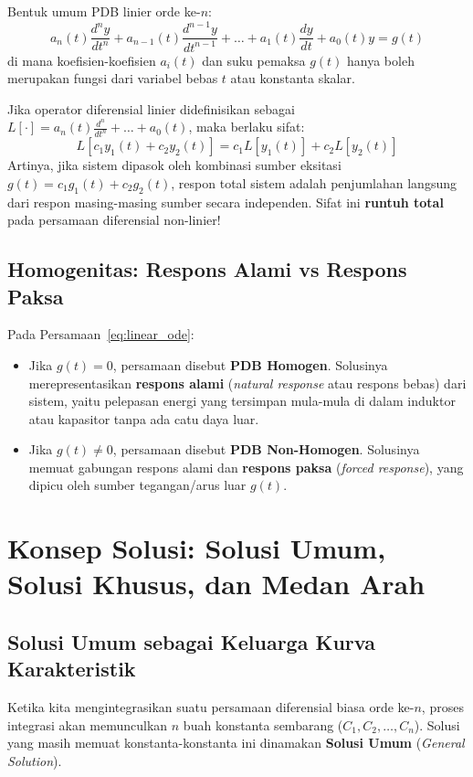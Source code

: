 \documentclass[11pt,a4paper]{article}
\theoremstyle{definition}
\begin{document}
Bentuk umum PDB linier orde ke-$n$:
\begin{equation}
    a_n(t) \frac{d^ny}{dt^n} + a_{n-1}(t) \frac{d^{n-1}y}{dt^{n-1}} + \dots + a_1(t) \frac{dy}{dt} + a_0(t) y = g(t)
    \label{eq:linear_ode}
\end{equation}
di mana koefisien-koefisien $a_i(t)$ dan suku pemaksa $g(t)$ hanya boleh merupakan fungsi dari variabel bebas $t$ atau konstanta skalar.

\begin{tcolorbox}[colback=yellow!10!white,colframe=orange!80!black,title=\textbf{Prinsip Superposisi pada PDB Linier}]
Jika operator diferensial linier didefinisikan sebagai $L[\cdot] = a_n(t)\frac{d^n}{dt^n} + \dots + a_0(t)$, maka berlaku sifat:
\begin{equation}
    L[c_1 y_1(t) + c_2 y_2(t)] = c_1 L[y_1(t)] + c_2 L[y_2(t)]
\end{equation}
Artinya, jika sistem dipasok oleh kombinasi sumber eksitasi $g(t) = c_1 g_1(t) + c_2 g_2(t)$, respon total sistem adalah penjumlahan langsung dari respon masing-masing sumber secara independen. Sifat ini \textbf{runtuh total} pada persamaan diferensial non-linier!
\end{tcolorbox}

\subsection{Homogenitas: Respons Alami vs Respons Paksa}
Pada Persamaan~\eqref{eq:linear_ode}:
\begin{itemize}
    \item Jika $g(t) = 0$, persamaan disebut \textbf{PDB Homogen}. Solusinya merepresentasikan \textbf{respons alami} (\textit{natural response} atau respons bebas) dari sistem, yaitu pelepasan energi yang tersimpan mula-mula di dalam induktor atau kapasitor tanpa ada catu daya luar.
    \item Jika $g(t) \neq 0$, persamaan disebut \textbf{PDB Non-Homogen}. Solusinya memuat gabungan respons alami dan \textbf{respons paksa} (\textit{forced response}), yang dipicu oleh sumber tegangan/arus luar $g(t)$.
\end{itemize}


\section{Konsep Solusi: Solusi Umum, Solusi Khusus, dan Medan Arah}

\subsection{Solusi Umum sebagai Keluarga Kurva Karakteristik}
Ketika kita mengintegrasikan suatu persamaan diferensial biasa orde ke-$n$, proses integrasi akan memunculkan $n$ buah konstanta sembarang ($C_1, C_2, \dots, C_n$). Solusi yang masih memuat konstanta-konstanta ini dinamakan \textbf{Solusi Umum} (\textit{General Solution}).
\end{document}
